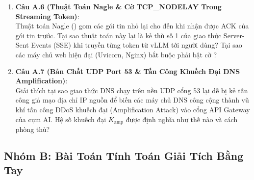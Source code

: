 \begin{enumerate}
  \item \textbf{Câu A.6 (Thuật Toán Nagle \& Cờ TCP\_NODELAY Trong Streaming Token)}: \\
  Thuật toán Nagle () gom các gói tin nhỏ lại cho đến khi nhận được ACK của gói tin trước. Tại sao thuật toán này lại là kẻ thù số 1 của giao thức Server-Sent Events (SSE) khi truyền từng token từ vLLM tới người dùng? Tại sao các máy chủ web hiện đại (Uvicorn, Nginx) bắt buộc phải bật cờ ?
  \item \textbf{Câu A.7 (Bản Chất UDP Port 53 \& Tấn Công Khuếch Đại DNS Amplification)}: \\
  Giải thích tại sao giao thức DNS chạy trên nền UDP cổng 53 lại dễ bị kẻ tấn công giả mạo địa chỉ IP nguồn để biến các máy chủ DNS công cộng thành vũ khí tấn công DDoS khuếch đại (Amplification Attack) vào cổng API Gateway của cụm AI. Hệ số khuếch đại $K_{\text{amp}}$ được định nghĩa như thế nào và cách phòng thủ?
\end{enumerate}

\subsection{Nhóm B: Bài Toán Tính Toán Giải Tích Bằng Tay}


